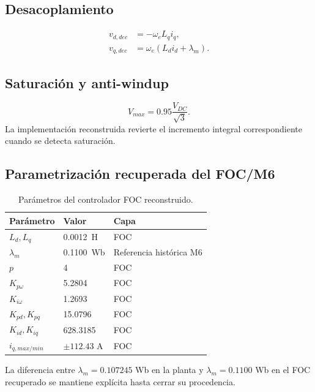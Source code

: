 \subsection{Desacoplamiento}
\begin{align}
v_{d,dec}&=-\omega_eL_qi_q,\\
v_{q,dec}&=\omega_e(L_di_d+\lambda_m).
\end{align}

\subsection{Saturación y anti-windup}
\begin{equation}
V_{max}=0.95\frac{V_{DC}}{\sqrt{3}}.
\end{equation}
La implementación reconstruida revierte el incremento integral correspondiente cuando se detecta saturación.

\subsection{Parametrización recuperada del FOC/M6}
\begin{table}[H]
\centering
\caption{Parámetros del controlador FOC reconstruido.}
\begin{tabular}{lll}
\toprule
Parámetro & Valor & Capa \\
\midrule
$L_d,L_q$ & \SI{0.0012}{H} & FOC \\
$\lambda_m$ & \SI{0.1100}{Wb} & Referencia histórica M6 \\
$p$ & 4 & FOC \\
$K_{p\omega}$ & 5.2804 & FOC \\
$K_{i\omega}$ & 1.2693 & FOC \\
$K_{pd},K_{pq}$ & 15.0796 & FOC \\
$K_{id},K_{iq}$ & 628.3185 & FOC \\
$i_{q,max/min}$ & $\pm112.43$ A & FOC \\
\bottomrule
\end{tabular}
\end{table}

La diferencia entre $\lambda_m=0.107245$ Wb en la planta y $\lambda_m=0.1100$ Wb en el FOC recuperado se mantiene explícita hasta cerrar su procedencia.
